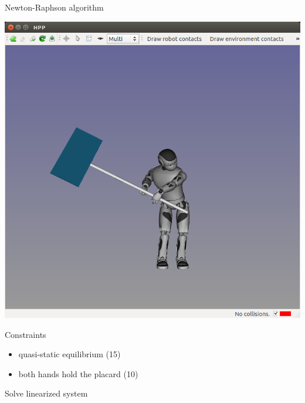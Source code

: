 \begin {frame} {Newton-Raphson algorithm}
  \parbox {.5\linewidth} {
    \centerline {
      \includegraphics [width=\linewidth] {figures/seq/romeo-6.png}
    }
  }
  \hspace*{.05\linewidth}
  \parbox {.39\linewidth} {
    Constraints
    \begin {itemize}
    \item quasi-static equilibrium (15)
    \item both hands hold the placard (10)
    \end{itemize}
  }
  \centerline {
    Solve linearized system
  }
\end {frame}

